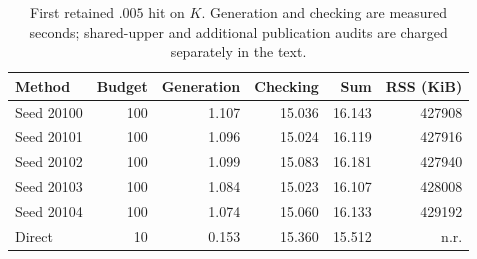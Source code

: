 \begin{table}[htbp]\centering\small
\caption{First retained $.005$ hit on $K$. Generation and checking are measured seconds; shared-upper and additional publication audits are charged separately in the text.}
\setlength{\tabcolsep}{3pt}\begin{tabular}{lrrrrr}\toprule
Method & Budget & Generation & Checking & Sum & RSS (KiB) \\ \midrule
Seed 20100 & 100 & 1.107 & 15.036 & 16.143 & 427908 \\
Seed 20101 & 100 & 1.096 & 15.024 & 16.119 & 427916 \\
Seed 20102 & 100 & 1.099 & 15.083 & 16.181 & 427940 \\
Seed 20103 & 100 & 1.084 & 15.023 & 16.107 & 428008 \\
Seed 20104 & 100 & 1.074 & 15.060 & 16.133 & 429192 \\
Direct & 10 & 0.153 & 15.360 & 15.512 & n.r. \\
\bottomrule\end{tabular}
\end{table}
